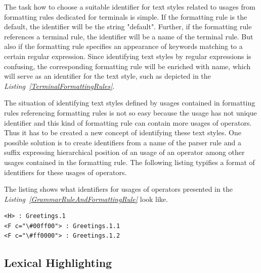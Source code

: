 \documentclass[12pt,notitlepage,a4paper]{report}
\begin{document}
The task how to choose a suitable identifier for text styles related to usages from formatting rules dedicated for terminals is simple. If the formatting rule is the default, the identifier will be the string "default". Further, if the formatting rule references a terminal rule, the identifier will be a name of the terminal rule. But also if the formatting rule specifies an appearance of keywords matching to a certain regular expression. Since identifying text styles by regular expressions is confusing, the corresponding formatting rule will be enriched with name, which will serve as an identifier for the text style, such as depicted in the \textit{Listing~\ref{TerminalFormattingRules}}.

The situation of identifying text styles defined by usages contained in formatting rules referencing formatting rules is not so easy because the usage has not unique identifier and this kind of formatting rule can contain more usages of operators. Thus it has to be created a new concept of identifying these text styles. One possible solution is to create identifiers from a name of the parser rule and a suffix expressing hierarchical position of an usage of an operator among other usages contained in the formatting rule. The following listing typifies a format of identifiers for these usages of operators.

\begin{expl}\label{ParserRuleIdentifiers}
The listing shows what identifiers for usages of operators presented in the \textit{Listing~\ref{GrammarRuleAndFormattingRule}} look like.
\begingroup
\fontsize{10pt}{12pt}
\begin{Verbatim}[commandchars=\\\{\}]
<H> : Greetings.1
<F c="\#00ff00"> : Greetings.1.1
<F c="\#ff0000"> : Greetings.1.2
\end{Verbatim}
\endgroup
\end{expl}

\subsection{Lexical Highlighting}
\end{document}
